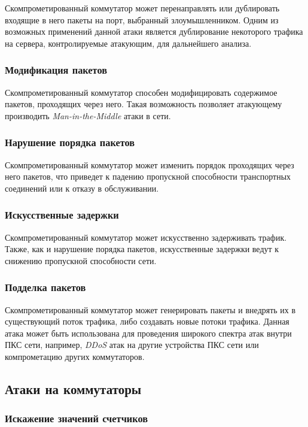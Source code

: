 \documentclass[../thesis.tex]{subfiles}
\begin{document}
Скомпрометированный коммутатор может перенаправлять или дублировать входящие в него пакеты на порт, выбранный злоумышленником.
Одним из возможных применений данной атаки является дублирование некоторого трафика на сервера, контролируемые атакующим, для дальнейшего анализа.

\subsubsection{Модификация пакетов}

Скомпрометированный коммутатор способен модифицировать содержимое пакетов, проходящих через него.
Такая возможность позволяет атакующему производить \textit{Man-in-the-Middle} атаки \cite{desmedt2011man} в сети.

\subsubsection{Нарушение порядка пакетов}

Скомпрометированный коммутатор может изменить порядок проходящих через него пакетов, что приведет к падению пропускной способности транспортных соединений или к отказу в обслуживании.

\subsubsection{Искусственные задержки}

Скомпрометированный коммутатор может искусственно задерживать трафик.
Также, как и нарушение порядка пакетов, искусственные задержки ведут к снижению пропускной способности сети.

\subsubsection{Подделка пакетов}

Скомпрометированный коммутатор может генерировать пакеты и внедрять их в существующий поток трафика, либо создавать новые потоки трафика.
Данная атака может быть использована для проведения широкого спектра атак внутри ПКС сети, например, \textit{DDoS} атак \cite{mirkovic2004taxonomy} на другие устройства ПКС сети или компрометацию других коммутаторов.

\subsection{Атаки на коммутаторы}

\subsubsection{Искажение значений счетчиков}
\end{document}
